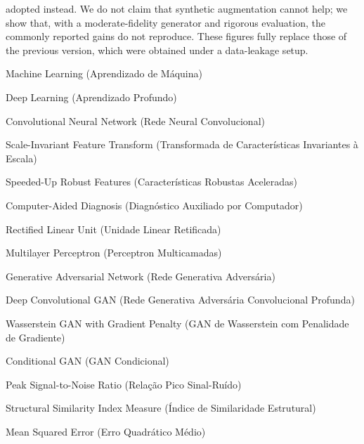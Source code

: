\documentclass[
	12pt,				%
	openright,			%
	oneside,			%
	a4paper,			%
	tcc,			%
	]{ABNT-DC-UEL}
\begin{document}
\begin{Abstract}
adopted instead. We do not claim that synthetic augmentation cannot help; we show that, with a moderate-fidelity generator and rigorous evaluation, the commonly reported gains do not reproduce. These figures fully replace those of the previous version, which were obtained under a data-leakage setup.
\end{Abstract}

\listoffigures*
\cleardoublepage

\listoftables*
\cleardoublepage

\begin{siglas}
  \item[ML] Machine Learning (Aprendizado de Máquina)
  \item[DL] Deep Learning (Aprendizado Profundo)
  \item[CNN] Convolutional Neural Network (Rede Neural Convolucional)
  \item[SIFT] Scale-Invariant Feature Transform (Transformada de Características Invariantes à Escala)
  \item[SURF] Speeded-Up Robust Features (Características Robustas Aceleradas)
  \item[CAD] Computer-Aided Diagnosis (Diagnóstico Auxiliado por Computador)
  \item[ReLU] Rectified Linear Unit (Unidade Linear Retificada)
  \item[MLP] Multilayer Perceptron (Perceptron Multicamadas)
  \item[GAN] Generative Adversarial Network (Rede Generativa Adversária)
  \item[DCGAN] Deep Convolutional GAN (Rede Generativa Adversária Convolucional Profunda)
  \item[WGAN-GP] Wasserstein GAN with Gradient Penalty (GAN de Wasserstein com Penalidade de Gradiente)
  \item[cGAN] Conditional GAN (GAN Condicional)
  \item[PSNR] Peak Signal-to-Noise Ratio (Relação Pico Sinal-Ruído)
  \item[SSIM] Structural Similarity Index Measure (Índice de Similaridade Estrutural)
  \item[MSE] Mean Squared Error (Erro Quadrático Médio)

\end{siglas}
\end{document}
